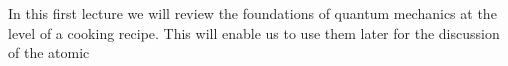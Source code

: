In this first lecture we will review the foundations of quantum mechanics at the level of a cooking recipe. This will enable us to use them later for the discussion of the atomic 